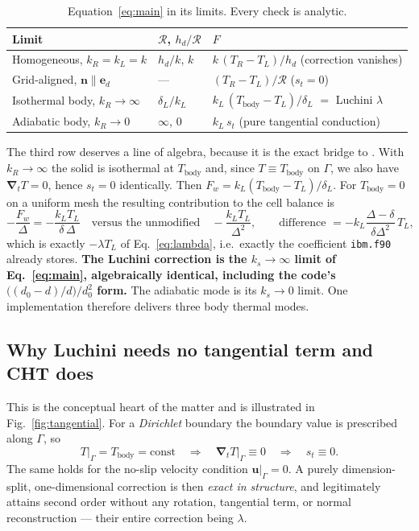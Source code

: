 \documentclass[11pt,a4paper]{article}
\newcommand{\ed}{\boldsymbol{e}_d}
\newcommand{\nn}{\boldsymbol{n}}
\newcommand{\grad}{\boldsymbol{\nabla}}
\newcommand{\Rser}{\mathcal{R}}
\newcommand{\code}[1]{\texttt{#1}}
\begin{document}
\begin{table}[htbp]
\centering
\caption{Equation~\eqref{eq:main} in its limits. Every check is analytic.}
\label{tab:limits}
\begin{tabular}{@{}lll@{}}
\toprule
Limit & $\Rser$, $h_d/\Rser$ & $F$ \\
\midrule
Homogeneous, $k_R=k_L=k$
  & $h_d/k$, \; $k$
  & $k\,(T_R-T_L)/h_d$ \quad(correction vanishes)\\
Grid-aligned, $\nn\parallel\ed$
  & ---
  & $(T_R-T_L)/\Rser$ \quad($s_t=0$)\\
Isothermal body, $k_R\to\infty$
  & $\delta_L/k_L$
  & $k_L\,(T_\text{body}-T_L)/\delta_L$ \quad$=$ Luchini $\lambda$ \\
Adiabatic body, $k_R\to0$
  & $\infty$, \; $0$
  & $k_L\,s_t$ \quad(pure tangential conduction)\\
\bottomrule
\end{tabular}
\end{table}

The third row deserves a line of algebra, because it is the exact bridge to
\cite{luchini2025}. With $k_R\to\infty$ the solid is isothermal at
$T_{\text{body}}$ and, since $T\equiv T_{\text{body}}$ on $\Gamma$, we also have
$\grad_tT=0$, hence $s_t=0$ identically. Then
$F_w=k_L(T_{\text{body}}-T_L)/\delta_L$. For $T_{\text{body}}=0$ on a uniform
mesh the resulting contribution to the cell balance is
\begin{equation}
  -\frac{F_w}{\Delta} = -\frac{k_L T_L}{\delta\,\Delta}
  \quad\text{versus the unmodified}\quad
  -\frac{k_L T_L}{\Delta^{2}},
  \qquad\text{difference }= -k_L\frac{\Delta-\delta}{\delta\Delta^{2}}\,T_L,
\end{equation}
which is exactly $-\lambda T_L$ of Eq.~\eqref{eq:lambda}, i.e.\ exactly the
coefficient \code{ibm.f90} already stores. \textbf{The Luchini correction is the
$k_s\to\infty$ limit of Eq.~\eqref{eq:main}, algebraically identical, including
the code's $\big((d_0-d)/d\big)/d_0^{2}$ form.} The adiabatic mode is its
$k_s\to0$ limit. One implementation therefore delivers three body thermal
modes.

\subsection{Why Luchini needs no tangential term and CHT does}
\label{sec:whytangential}

This is the conceptual heart of the matter and is illustrated in
Fig.~\ref{fig:tangential}. For a \emph{Dirichlet} boundary the boundary value is
prescribed along $\Gamma$, so
\begin{equation}
  T\big|_\Gamma = T_{\text{body}} = \text{const}
  \quad\Longrightarrow\quad
  \grad_tT\big|_\Gamma \equiv 0
  \quad\Longrightarrow\quad
  s_t \equiv 0 .
\end{equation}
The same holds for the no-slip velocity condition $\boldsymbol{u}|_\Gamma=0$.
A purely dimension-split, one-dimensional correction is then \emph{exact in
structure}, and \cite{luchini2025} legitimately attains second order without any
rotation, tangential term, or normal reconstruction --- their entire correction
being $\lambda$.
\end{document}
